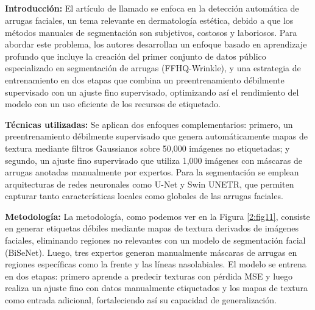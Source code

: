 \subsection{}

\textbf{Introducción:}
El artículo de \cite{moon2024dermatology} llamado  se enfoca en la detección automática de arrugas faciales, un tema relevante en dermatología estética, debido a que los métodos manuales de segmentación son subjetivos, costosos y laboriosos. Para abordar este problema, los autores desarrollan un enfoque basado en aprendizaje profundo que incluye la creación del primer conjunto de datos público especializado en segmentación de arrugas (FFHQ-Wrinkle), y una estrategia de entrenamiento en dos etapas que combina un preentrenamiento débilmente supervisado con un ajuste fino supervisado, optimizando así el rendimiento del modelo con un uso eficiente de los recursos de etiquetado.

\textbf{Técnicas utilizadas:}
Se aplican dos enfoques complementarios: primero, un preentrenamiento débilmente supervisado que genera automáticamente mapas de textura mediante filtros Gaussianos sobre 50,000 imágenes no etiquetadas; y segundo, un ajuste fino supervisado que utiliza 1,000 imágenes con máscaras de arrugas anotadas manualmente por expertos. Para la segmentación se emplean arquitecturas de redes neuronales como U-Net y Swin UNETR, que permiten capturar tanto características locales como globales de las arrugas faciales.

\textbf{Metodología:}
La metodología, como podemos ver en la Figura \ref{2:fig11}, consiste en generar etiquetas débiles mediante mapas de textura derivados de imágenes faciales, eliminando regiones no relevantes con un modelo de segmentación facial (BiSeNet). Luego, tres expertos generan manualmente máscaras de arrugas en regiones específicas como la frente y las líneas nasolabiales. El modelo se entrena en dos etapas: primero aprende a predecir texturas con pérdida MSE y luego realiza un ajuste fino con datos manualmente etiquetados y los mapas de textura como entrada adicional, fortaleciendo así su capacidad de generalización.

